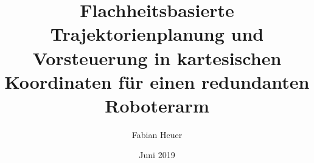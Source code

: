 \documentclass[graybox,envcountchap,twoside,deutsch]{lrt_thesis}
\begin{document}
%
\author{Fabian Heuer}
\title{Flachheitsbasierte Trajektorienplanung und Vorsteuerung in kartesischen Koordinaten für einen redundanten Roboterarm }
\date{Juni 2019}
\maketitle

\fronttitle
\frontmatter
\tableofcontents
\mainmatter


\graphicspath{{figures/}}










\finalmatter
\end{document}
